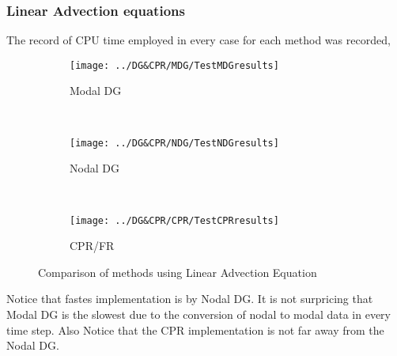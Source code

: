 \begin{frame} \frametitle{Linear Advection equations}
The record of CPU time employed in every case for each method was recorded,
	\begin{figure}
        \centering
        \begin{subfigure}[b]{0.31\textwidth}
                \centering
                \texttt{[image: ../DG\&CPR/MDG/TestMDGresults]}
                \caption{Modal DG}
                \label{fig:TestMDGresults_CPUtime}
        \end{subfigure}%
				~
        \begin{subfigure}[b]{0.31\textwidth}
                \centering
                \texttt{[image: ../DG\&CPR/NDG/TestNDGresults]}
                \caption{Nodal DG}
                \label{fig:TestNDGresults_CPUtime}
        \end{subfigure}
				~
        \begin{subfigure}[b]{0.31\textwidth}
								\centering
                \texttt{[image: ../DG\&CPR/CPR/TestCPRresults]}
                \caption{CPR/FR}
                \label{fig:TestCPRresults_CPUtime}
        \end{subfigure}
				\caption{Comparison of methods using Linear Advection Equation}
				\label{fig:compareLinearAdvection_p3p4p5_CPUtime}
	\end{figure}
	Notice that fastes implementation is by Nodal DG. It is not surpricing that Modal DG is the slowest due to the conversion of nodal to modal data in every time step. Also Notice that the CPR implementation is not far away from the Nodal DG.
\end{frame}

